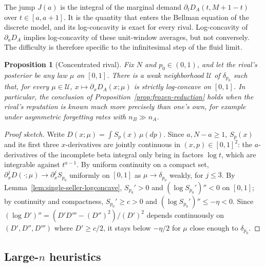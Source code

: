 \documentclass[11pt]{article}
\newtheorem{proposition}{Proposition}
\theoremstyle{definition}
\begin{document}
The jump $J(a)$ is the integral of the marginal demand
$\partial_tD_A(t,M+1-t)$ over $t\in[a,a+1]$. It is the quantity that enters
the Bellman equation of the discrete model, and its log-concavity is exact
for every rival. Log-concavity of $\partial_aD_A$ implies log-concavity of
these unit-window averages, but not conversely. The difficulty is therefore
specific to the infinitesimal step of the fluid limit.

\begin{proposition}[Concentrated rival]\label{prop:concentrated-rival}
Fix $N$ and $p_0\in(0,1)$, and let the rival's posterior be any law $\mu$ on
$[0,1]$. There is a weak neighborhood $\mathcal U$ of $\delta_{p_0}$ such
that, for every $\mu\in\mathcal U$, $x\mapsto\partial_xD_A(x;\mu)$ is
strictly log-concave on $[0,1]$. In particular, the conclusion of
Proposition~\ref{prop:frozen-reduction} holds when the rival's reputation is
known much more precisely than one's own, for example under asymmetric
forgetting rates with $n_B\gg n_A$.
\end{proposition}

\begin{proof}[Proof sketch]
Write $D(x;\mu)=\int S_p(x)\,\mu(dp)$. Since $a,N-a\geq1$, $S_p(x)$ and its
first three $x$-derivatives are jointly continuous in $(x,p)\in[0,1]^2$:
the $a$-derivatives of the incomplete beta integral only bring in factors
$\log t$, which are integrable against $t^{a-1}$. By uniform continuity on a
compact set, $\partial_x^jD(\cdot;\mu)\to\partial_x^jS_{p_0}$ uniformly on
$[0,1]$ as $\mu\to\delta_{p_0}$ weakly, for $j\leq3$. By
Lemma~\ref{lem:single-seller-logconcave}, $S_{p_0}'>0$ and
$(\log S_{p_0}')''<0$ on $[0,1]$; by continuity and compactness,
$S_{p_0}'\geq c>0$ and $(\log S_{p_0}')''\leq-\eta<0$. Since
$(\log D')''=(D'D'''-(D'')^2)/(D')^2$ depends continuously on
$(D',D'',D''')$ where $D'\geq c/2$, it stays below $-\eta/2$ for $\mu$ close
enough to $\delta_{p_0}$.
\end{proof}

\subsection{Large-\texorpdfstring{$n$}{n} heuristics}
\end{document}
